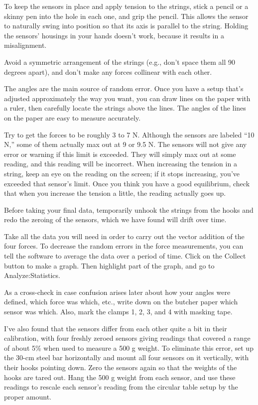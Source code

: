 To keep the sensors in place and apply tension to the strings, stick a pencil or a skinny
pen into the hole in each one, and grip the pencil. This allows the sensor to naturally swing
into position so that its axis is parallel to the string. Holding the sensors' housings in your
hands doesn't work, because it results in a misalignment.

Avoid a symmetric arrangement of
the strings (e.g., don't space them all 90 degrees apart), and
don't make any forces collinear with each other. 


The angles are the main source of random error. Once you have a setup that's adjusted
approximately the way you want, you can draw lines on the paper
with a ruler, then carefully locate the strings above the lines. The angles of the lines on
the paper are easy to measure accurately.

Try to get the forces to be roughly 3 to 7 N.
Although the sensors are labeled ``10 N,'' some of them actually max out at 9 or 9.5 N.
The sensors will not give any
error or warning if this limit is exceeded. They will simply max out at some
reading, and this reading will be incorrect. When increasing the tension in a string, keep an eye
on the reading on the screen; if it stops increasing, you've exceeded that sensor's limit.
Once you think you have a good equilibrium, check that when you increase the tension a little, the
reading actually goes up.

Before taking your final data, temporarily unhook the strings from the hooks and redo the zeroing of the
sensors, which we have found will drift over time.

Take all the data you will need in order to carry out the vector addition of the four forces.
To decrease the random errors in the force measurements, you can tell the software to average
the data over a period of time. Click on the Collect button to make a graph.
Then highlight part of the graph, and go to Analyze:Statistics.

As a cross-check in case confusion arises later about how your angles were defined, which
force was which, etc., write down on the butcher paper which sensor was which.
Also, 
mark the clamps 1, 2, 3, and 4 with masking tape.

I've also found that the sensors differ from each other quite a bit in their
calibration, with four freshly zeroed sensors giving readings
that covered a range of about 5\% when used to measure a 500 g weight.
To eliminate this error, set up the 30-cm steel bar
horizontally and mount all four sensors on it vertically, with their hooks pointing down.
Zero the sensors again so that the weights of the hooks are tared out.
Hang the 500 g weight from each sensor, and use these readings to
rescale each sensor's reading from the circular table setup by the proper amount.

